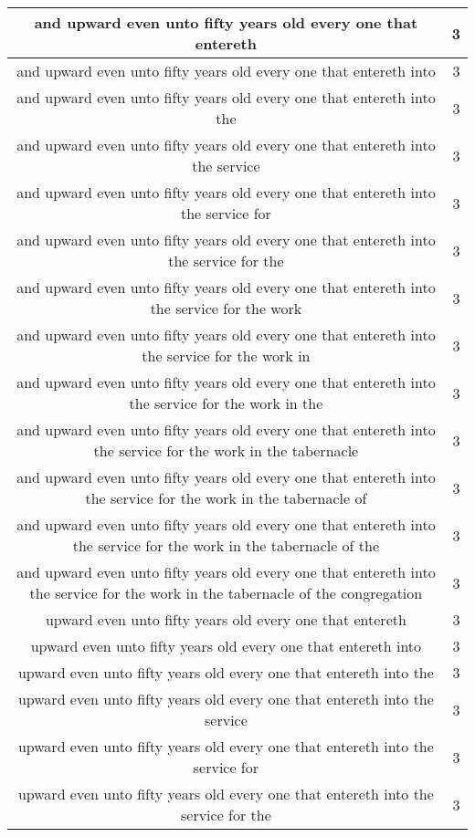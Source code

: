 \begin{center}
\begin{longtable}{|c|c|}
and upward even unto fifty years old every one that entereth & 3\\ \hline 
and upward even unto fifty years old every one that entereth into & 3\\ \hline 
and upward even unto fifty years old every one that entereth into the & 3\\ \hline 
and upward even unto fifty years old every one that entereth into the service & 3\\ \hline 
and upward even unto fifty years old every one that entereth into the service for & 3\\ \hline 
and upward even unto fifty years old every one that entereth into the service for the & 3\\ \hline 
and upward even unto fifty years old every one that entereth into the service for the work & 3\\ \hline 
and upward even unto fifty years old every one that entereth into the service for the work in & 3\\ \hline 
and upward even unto fifty years old every one that entereth into the service for the work in the & 3\\ \hline 
and upward even unto fifty years old every one that entereth into the service for the work in the tabernacle & 3\\ \hline 
and upward even unto fifty years old every one that entereth into the service for the work in the tabernacle of & 3\\ \hline 
and upward even unto fifty years old every one that entereth into the service for the work in the tabernacle of the & 3\\ \hline 
and upward even unto fifty years old every one that entereth into the service for the work in the tabernacle of the congregation & 3\\ \hline 
upward even unto fifty years old every one that entereth & 3\\ \hline 
upward even unto fifty years old every one that entereth into & 3\\ \hline 
upward even unto fifty years old every one that entereth into the & 3\\ \hline 
upward even unto fifty years old every one that entereth into the service & 3\\ \hline 
upward even unto fifty years old every one that entereth into the service for & 3\\ \hline 
upward even unto fifty years old every one that entereth into the service for the & 3\\ \hline 

\end{longtable}
\end{center}
